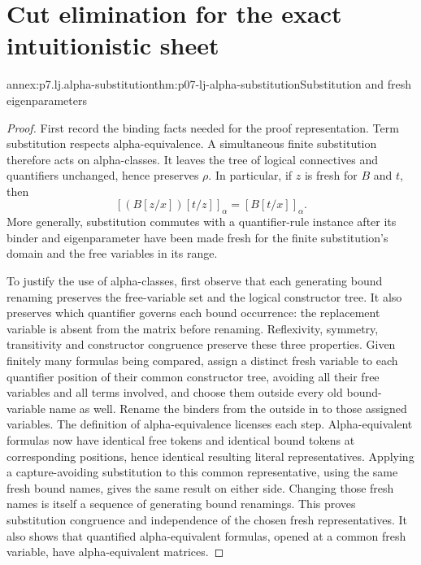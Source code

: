 \section{Cut elimination for the exact intuitionistic sheet}
\label{sec:p07-annex-intuitionistic-cut-elimination}

\begin{annexitem}{annex:p7.lj.alpha-substitution}{thm:p07-lj-alpha-substitution}{Substitution and fresh eigenparameters}
\begin{proof}
First record the binding facts needed for the proof representation.  Term
substitution respects alpha-equivalence.  A simultaneous finite substitution
therefore acts on alpha-classes.  It leaves the tree of logical connectives
and quantifiers unchanged, hence preserves \(\rho\).  In particular, if
\(z\) is fresh for \(B\) and \(t\), then
\[
             [(B[z/x])[t/z]]_\alpha=[B[t/x]]_\alpha.
\]
More generally, substitution commutes with a quantifier-rule instance
after its binder and eigenparameter have been made fresh for the finite
substitution's domain and the free variables in its range.

To justify the use of alpha-classes, first observe that each generating
bound renaming preserves the free-variable set and the logical constructor
tree.  It also preserves which quantifier governs each bound occurrence:
the replacement variable is absent from the matrix before renaming.
Reflexivity, symmetry, transitivity and constructor congruence preserve
these three properties.  Given finitely many formulas being compared,
assign a distinct fresh variable to each quantifier position of their
common constructor tree, avoiding all their free variables and all terms
involved, and choose them outside every old bound-variable name as well.
Rename the binders from the outside in to those assigned variables.
The definition of alpha-equivalence licenses each step.  Alpha-equivalent
formulas now have identical free tokens and identical bound tokens at
corresponding positions, hence identical resulting literal representatives.
Applying a capture-avoiding substitution to this common representative,
using the same fresh bound names, gives the same result on either side.
Changing those fresh names is itself a sequence of generating bound
renamings.  This proves substitution congruence and independence of the
chosen fresh representatives.  It also shows that quantified alpha-equivalent
formulas, opened at a common fresh variable, have alpha-equivalent matrices.


\end{proof}
\end{annexitem}

